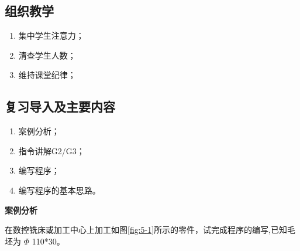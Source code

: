\jxhj{%
	}

\makeshouye %

\subsection{组织教学}
\begin{enumerate}[1、]
	\item 集中学生注意力；
	\item 清查学生人数；
	\item 维持课堂纪律；
\end{enumerate}
\subsection{复习导入及主要内容}
\begin{enumerate}[1、]
\item 案例分析；
\item 指令讲解G2/G3；
\item 编写程序；
\item 编写程序的基本思路。
\end{enumerate}

\textbf{案例分析}

在数控铣床或加工中心上加工如图\ref{fig:5-1}所示的零件，试完成程序的编写,已知毛坯为 $\Phi$ 110*30。

